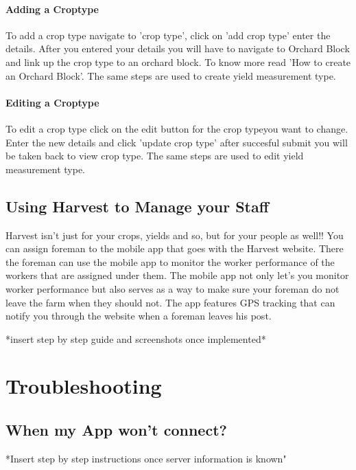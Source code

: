 \documentclass[11pt,fleqn]{book} %
\begin{document}
			\subsubsection{Adding a Croptype}
			To add a crop type navigate to 'crop type', click on 'add crop type' enter the details. After you entered your details you will have to navigate to Orchard Block and link up the crop type to an orchard block. To know more read 'How to create an Orchard Block'. The same steps are used to create yield measurement type.
			\subsubsection{Editing a Croptype}
			To edit a crop type click on the edit button for the crop typeyou want to change. Enter the new details and click 'update crop type' after succesful submit you will be taken back to view crop type. The same steps are used to edit yield measurement type.			
			
			
			
	\section{Using Harvest to Manage your Staff}
		Harvest isn't just for your crops, yields and so, but for your people as well!! You can assign foreman to the mobile app that goes with the Harvest website. There the foreman can use the mobile app to monitor the worker performance of the workers that are assigned under them. The mobile app not only let's you monitor worker performance but also serves as a way to make sure your foreman do not leave the farm when they should not. The app features GPS tracking that can notify you through the website when a foreman leaves his post.
		
		*insert step by step guide and screenshots once implemented*



\chapter{Troubleshooting}
	\section{When my App won't connect?}
		*Insert step by step instructions once server information is known"		
\end{document}
